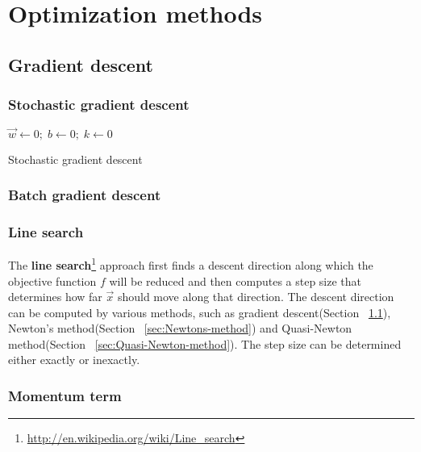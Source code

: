 \chapter{Optimization methods}
\label{chap:Optimization-methods}


\section{Gradient descent}
\label{sec:Gradient-descent}


\subsection{Stochastic gradient descent}

\begin{algorithm}[htbp]
	
    $\vec{w} \leftarrow 0;\; b \leftarrow 0;\; k \leftarrow 0$\;
\caption{Stochastic gradient descent}
\end{algorithm}


\subsection{Batch gradient descent}


\subsection{Line search}
The \textbf{line search}\footnote{\url{http://en.wikipedia.org/wiki/Line_search}} approach first finds a descent direction along which the objective function $f$ will be reduced and then computes a step size that determines how far $\vec{x}$ should move along that direction. The descent direction can be computed by various methods, such as gradient descent(Section ~\ref{sec:Gradient-descent}), Newton's method(Section ~\ref{sec:Newtons-method}) and Quasi-Newton method(Section ~\ref{sec:Quasi-Newton-method}). The step size can be determined either exactly or inexactly.


\subsection{Momentum term}


